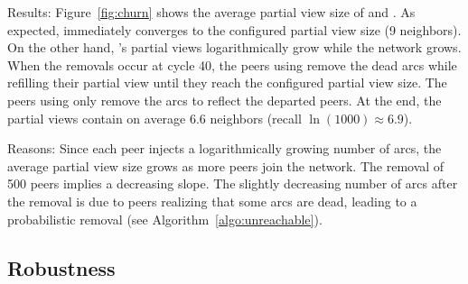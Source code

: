 \begin{asparadesc}
\item[Results:] Figure~\ref{fig:churn} shows the average partial view size of
  \SPRAY and \CYCLON. As expected, \CYCLON immediately converges to the
  configured partial view size (9 neighbors). On the other hand, \SPRAY's
  partial views logarithmically grow while the network grows. When the removals
  occur at cycle 40, the peers using \CYCLON remove the dead arcs while
  refilling their partial view until they reach the configured partial view
  size. The peers using \SPRAY only remove the arcs to reflect the departed
  peers. At the end, the \SPRAY partial views contain on average 6.6 neighbors
  (recall $\ln(1000)\approx 6.9$).
\item[Reasons:] Since each peer injects a logarithmically growing number of
  arcs, the average partial view size grows as more peers join the network.
  The removal of 500 peers implies a decreasing slope. The slightly decreasing
  number of arcs after the removal is due to peers realizing that some arcs are
  dead, leading to a probabilistic removal (see Algorithm~\ref{algo:unreachable}).
\end{asparadesc}


\subsection{Robustness}

